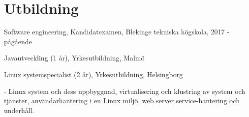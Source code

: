 \documentclass{article}
\begin{document}
\hfill
\begin{minipage}[t]{0.6\textwidth}

\section*{\textcolor{colorBlue}{Utbildning}}
Software engineering, Kandidatexamen, Blekinge tekniska högskola, 2017 - pågående

Javautveckling (1 år), Yrkesutbildning, Malmö

Linux systemspecialist (2 år), Yrkesutbildning, Helsingborg

- Linux system och dess uppbyggnad, virtualisering och klustring av system och tjänster, användarhantering i en Linux miljö, web server service-hantering och underhåll.

\end{minipage}%
\end{document}
